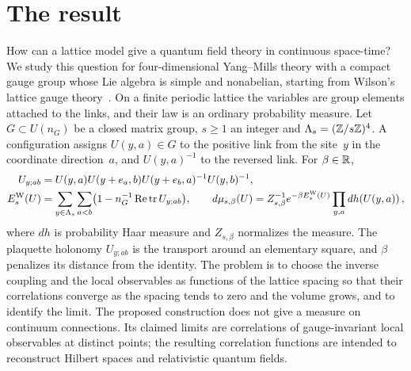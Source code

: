 \makeatletter
\providecommand{\equationalias}[1]{\protected@write\@auxout{}{\string\newlabel{#1}{{\theequation}{\thepage}{}{equation.\theHequation}{}}}}
\makeatother

\section{The result}\label{sec:introduction}\label{sec:result}

How can a lattice model give a quantum field theory in continuous space-time? We study this question for four-dimensional Yang--Mills theory with a compact gauge group whose Lie algebra is simple and nonabelian, starting from Wilson's lattice gauge theory~\cite{Wilson1974}. On a finite periodic lattice the variables are group elements attached to the links, and their law is an ordinary probability measure. Let $G\subset U(n_G)$ be a closed matrix group, $s\ge1$ an integer and $\Lambda_s=(\mathbb{Z}/s\mathbb{Z})^4$. A configuration assigns $U(y,a)\in G$ to the positive link from the site~$y$ in the coordinate direction~$a$, and $U(y,a)^{-1}$ to the reversed link. For $\beta\in\mathbb{R}$,
\begin{equation}\label{eq:intro-wilson}
\begin{aligned}
U_{y;ab}&=U(y,a)U(y+e_a,b)U(y+e_b,a)^{-1}U(y,b)^{-1},\\
E_s^{\rm W}(U)&=\sum_{y\in\Lambda_s}\sum_{a<b}\bigl(1-n_G^{-1}\operatorname{Re}\operatorname{tr} U_{y;ab}\bigr),\qquad
d\mu_{s,\beta}(U)=Z_{s,\beta}^{-1}e^{-\beta E_s^{\rm W}(U)}\prod_{y,a}dh(U(y,a))\,,
\end{aligned}
\end{equation}
where $dh$ is probability Haar measure and $Z_{s,\beta}$ normalizes the measure. The plaquette holonomy $U_{y;ab}$ is the transport around an elementary square, and $\beta$ penalizes its distance from the identity. The problem is to choose the inverse coupling and the local observables as functions of the lattice spacing so that their correlations converge as the spacing tends to zero and the volume grows, and to identify the limit. The proposed construction does not give a measure on continuum connections. Its claimed limits are correlations of gauge-invariant local observables at distinct points; the resulting correlation functions are intended to reconstruct Hilbert spaces and relativistic quantum fields.


